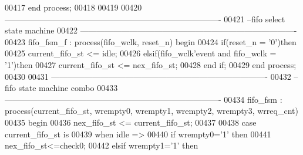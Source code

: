 \begin{DoxyCode}
00417 \textcolor{keywordflow}{end} \textcolor{keywordflow}{process};
00418 
00419 
00420 \textcolor{keyword}{-------------------------------------------------------------------------------}
00421 \textcolor{keyword}{--fifo select state machine}
00422 \textcolor{keyword}{-------------------------------------------------------------------------------}
00423 fifo\_fsm\_f : \textcolor{keywordflow}{process}(fifo_wclk, reset_n) \textcolor{keywordflow}{begin}
00424     \textcolor{keywordflow}{if}\textcolor{vhdlchar}{(}\textcolor{vhdlchar}{reset_n} \textcolor{vhdlchar}{=} \textcolor{vhdlchar}{'}\textcolor{vhdllogic}{}\textcolor{vhdllogic}{0}\textcolor{vhdlchar}{'}\textcolor{vhdlchar}{)}\textcolor{keywordflow}{then}
00425         \textcolor{vhdlchar}{current_fifo_st} \textcolor{vhdlchar}{<=} \textcolor{vhdlchar}{idle};
00426     \textcolor{keywordflow}{elsif}\textcolor{vhdlchar}{(}\textcolor{vhdlchar}{fifo_wclk}\textcolor{vhdlchar}{'}\textcolor{vhdlkeyword}{event} \textcolor{keywordflow}{and} \textcolor{vhdlchar}{fifo_wclk} \textcolor{vhdlchar}{=} \textcolor{vhdlchar}{'}\textcolor{vhdllogic}{}\textcolor{vhdllogic}{1}\textcolor{vhdlchar}{'}\textcolor{vhdlchar}{)}\textcolor{keywordflow}{then} 
00427         \textcolor{vhdlchar}{current_fifo_st} \textcolor{vhdlchar}{<=} \textcolor{vhdlchar}{nex_fifo_st};
00428     \textcolor{keywordflow}{end} \textcolor{keywordflow}{if}; 
00429 \textcolor{keywordflow}{end} \textcolor{keywordflow}{process};
00430 
00431 \textcolor{keyword}{-------------------------------------------------------------------------------}
00432 \textcolor{keyword}{--fifo state machine combo}
00433 \textcolor{keyword}{-------------------------------------------------------------------------------}
00434 fifo\_fsm : \textcolor{keywordflow}{process}(current_fifo_st, wrempty0, wrempty1, wrempty2, wrempty3, 
      wrreq_cnt) 
00435 \textcolor{vhdlkeyword}{begin}
00436     \textcolor{vhdlchar}{nex_fifo_st} \textcolor{vhdlchar}{<=} \textcolor{vhdlchar}{current_fifo_st};
00437     
00438     \textcolor{keywordflow}{case} \textcolor{vhdlchar}{current_fifo_st} \textcolor{keywordflow}{is}
00439       \textcolor{keywordflow}{when} \textcolor{vhdlchar}{idle} \textcolor{vhdlchar}{=}\textcolor{vhdlchar}{>}
00440             \textcolor{keywordflow}{if} \textcolor{vhdlchar}{wrempty0}\textcolor{vhdlchar}{=}\textcolor{vhdlchar}{'}\textcolor{vhdllogic}{}\textcolor{vhdllogic}{1}\textcolor{vhdlchar}{'} \textcolor{keywordflow}{then} 
00441               \textcolor{vhdlchar}{nex_fifo_st}\textcolor{vhdlchar}{<=}\textcolor{vhdlchar}{check0};
00442             \textcolor{keywordflow}{elsif} \textcolor{vhdlchar}{wrempty1}\textcolor{vhdlchar}{=}\textcolor{vhdlchar}{'}\textcolor{vhdllogic}{}\textcolor{vhdllogic}{1}\textcolor{vhdlchar}{'} \textcolor{keywordflow}{then} 

\end{DoxyCode}
